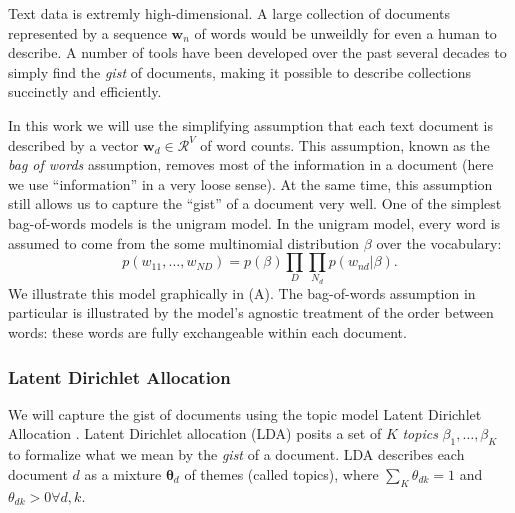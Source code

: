   
  Text data is extremly high-dimensional.  A large collection of
  documents represented by a sequence $\bm w_n$ of words would be
  unweildly for even a human to describe.  A number of tools have been
  developed over the past several decades to simply find the
  \emph{gist} of documents, making it possible to describe collections
  succinctly and efficiently.

  In this work we will use the simplifying assumption that each text
  document is described by a vector $\bm w_d \in \mathcal{R}^V$ of
  word counts.  This assumption, known as the \emph{bag of words}
  assumption, removes most of the information in a document (here we
  use ``information'' in a very loose sense).  At the same time, this
  assumption still allows us to capture the ``gist'' of a document
  very well. One of the simplest bag-of-words models is the unigram
  model. In the unigram model, every word is assumed to come from the
  some multinomial distribution $\beta$ over the vocabulary:
  \[
    p(w_{11}, \ldots, w_{ND}) = p(\beta) \prod_D \prod_{N_d} p(w_{nd} |
  \beta). \]
  We illustrate this model graphically in
   (A).  The bag-of-words assumption in
  particular is illustrated by the model's agnostic treatment of the
  order between words: these words are fully exchangeable within each
  document.

\subsubsection{Latent Dirichlet Allocation}
We will capture the gist of documents using the topic model Latent
Dirichlet Allocation \cite{blei:2003}.  Latent Dirichlet allocation
(LDA) posits a set of $K$ \emph{topics} $\beta_1, \ldots, \beta_K$ to
formalize what we mean by the \emph{gist} of a document.  LDA
describes each document $d$ as a mixture $\bm \theta_d$ of themes
(called topics), where $\sum_K \theta_{dk} = 1$ and $\theta_{dk} > 0
\forall d,k$.

